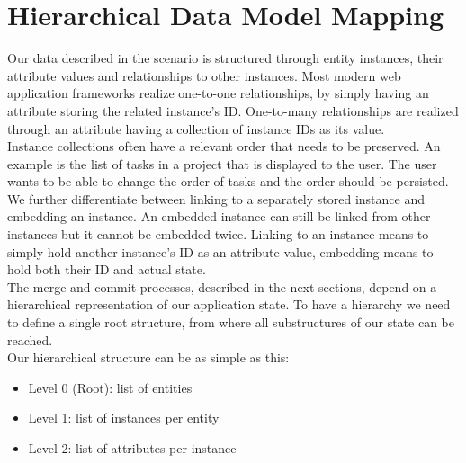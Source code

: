 
\section{Hierarchical Data Model Mapping}
\label{sec:histo.hierarchy}
Our data described in the scenario is structured through entity instances, their attribute values and relationships to other instances.
Most modern web application frameworks realize one-to-one relationships, by simply having an attribute storing the related instance's ID.
One-to-many relationships are realized through an attribute having a collection of 
instance IDs as its value.\\
Instance collections often have a relevant order that needs to be preserved.
An example is the list of tasks in a project that is displayed to the user.
The user wants to be able to change the order of tasks and the order should be persisted.\\
We further differentiate between linking to a separately stored instance and  embedding an instance.
An embedded instance can still be linked from other instances but it cannot be embedded twice.
Linking to an instance means to simply hold another instance's ID as an attribute value, embedding means to hold both their ID and actual state.\\

The merge and commit processes, described in the next sections, depend on a hierarchical representation of our application state.
To have a hierarchy we need to define a single root structure, from where all substructures of our state can be reached.\\
Our hierarchical structure can be as simple as this:

\begin{itemize}
\item Level 0 (Root): list of entities
\item Level 1: list of instances per entity
\item Level 2: list of attributes per instance
\end{itemize}

